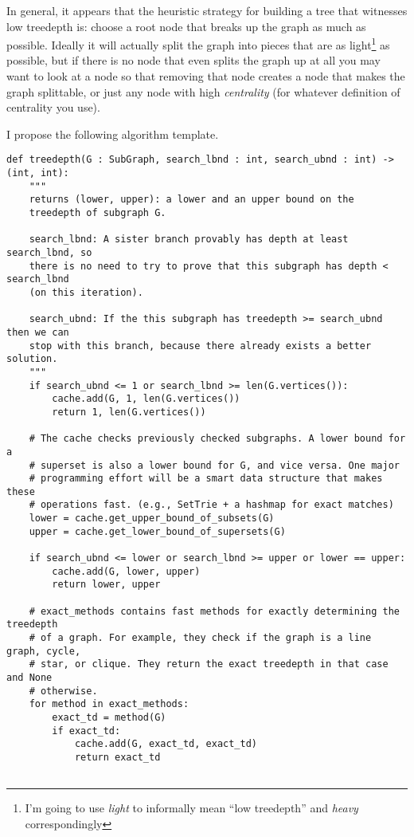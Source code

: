 \documentclass{article}
\theoremstyle{definition}
\begin{document}
In general, it appears that the heuristic strategy for building a tree that witnesses
low treedepth is: choose a root node that breaks up the graph as much as possible. Ideally it
will actually split the graph into pieces that are as light\footnote{I'm going to use
\emph{light} to informally mean ``low treedepth'' and \emph{heavy} correspondingly} as
possible, but if there is no node that even splits the graph up at all you may want to look at
a node so that removing that node creates a node that makes the graph splittable, or just any
node with high \emph{centrality} (for whatever definition of centrality you use). 

I propose the following algorithm template.
\begin{verbatim}
def treedepth(G : SubGraph, search_lbnd : int, search_ubnd : int) -> (int, int):
    """
    returns (lower, upper): a lower and an upper bound on the
    treedepth of subgraph G.

    search_lbnd: A sister branch provably has depth at least search_lbnd, so
    there is no need to try to prove that this subgraph has depth < search_lbnd
    (on this iteration).

    search_ubnd: If the this subgraph has treedepth >= search_ubnd then we can
    stop with this branch, because there already exists a better solution.
    """
    if search_ubnd <= 1 or search_lbnd >= len(G.vertices()):
        cache.add(G, 1, len(G.vertices())
        return 1, len(G.vertices())
  
    # The cache checks previously checked subgraphs. A lower bound for a
    # superset is also a lower bound for G, and vice versa. One major
    # programming effort will be a smart data structure that makes these
    # operations fast. (e.g., SetTrie + a hashmap for exact matches)
    lower = cache.get_upper_bound_of_subsets(G)
    upper = cache.get_lower_bound_of_supersets(G)

    if search_ubnd <= lower or search_lbnd >= upper or lower == upper:
        cache.add(G, lower, upper)
        return lower, upper

    # exact_methods contains fast methods for exactly determining the treedepth
    # of a graph. For example, they check if the graph is a line graph, cycle,
    # star, or clique. They return the exact treedepth in that case and None
    # otherwise.
    for method in exact_methods:
        exact_td = method(G)
        if exact_td:
            cache.add(G, exact_td, exact_td)
            return exact_td
    

\end{verbatim}
\end{document}
